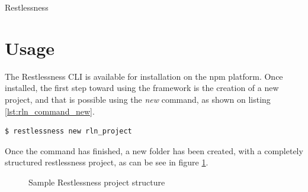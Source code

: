 \begin{chapter}{Restlessness}
    \section{Usage}
    \label{sec:rln_project_usage}

    The Restlessness CLI is available for installation on the npm platform. Once
    installed, the first step toward using the framework is the creation of a new
    project, and that is possible using the \textit{new} command, as shown
    on listing \ref{lst:rln_command_new}.

    \bigskip
    \begin{lstlisting}[caption=New command, label={lst:rln_command_new}]
$ restlessness new rln_project
    \end{lstlisting}

    Once the command has finished, a new folder has been created, with a completely
    structured restlessness project, as can be see in figure
    \ref{fig:sample_rln_project_folder}.

    \begin{figure}
        \begin{minipage}{\linewidth}
        \end{minipage}
        \caption{Sample Restlessness project structure}
        \label{fig:sample_rln_project_folder}
    \end{figure}


\end{chapter}
